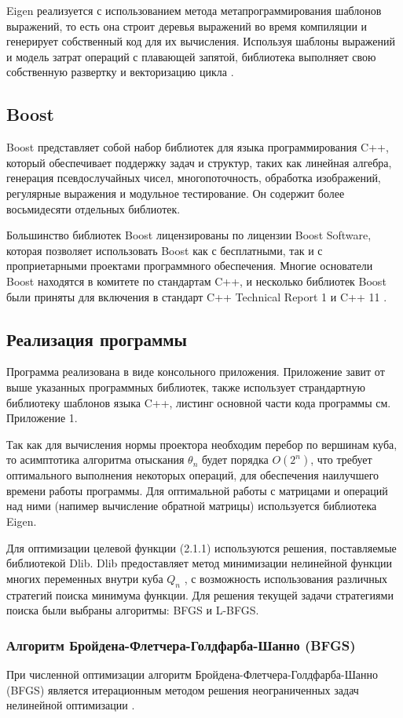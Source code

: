 \documentclass[12pt, a4paper]{extarticle}
\begin{document}
Eigen реализуется с использованием метода метапрограммирования шаблонов выражений, то есть она строит деревья выражений во время компиляции и генерирует собственный код для их вычисления. Используя шаблоны выражений и модель затрат операций с плавающей запятой, библиотека выполняет свою собственную развертку и векторизацию цикла \cite{4}.

\subsection{Boost}
Boost представляет собой набор библиотек для языка программирования C++, который обеспечивает поддержку задач и структур, таких как линейная алгебра, генерация псевдослучайных чисел, многопоточность, обработка изображений, регулярные выражения и модульное тестирование. Он содержит более восьмидесяти отдельных библиотек.

Большинство библиотек Boost лицензированы по лицензии Boost Software, которая позволяет использовать Boost как с бесплатными, так и с проприетарными проектами программного обеспечения. Многие основатели Boost находятся в комитете по стандартам C++, и несколько библиотек Boost были приняты для включения в стандарт C++ Technical Report 1 и C++ 11 \cite{5}.

\subsection{Реализация программы}
Программа реализована в виде консольного приложения. Приложение завит от выше указанных программных библиотек, также использует страндартную библиотеку шаблонов языка C++, листинг основной части кода программы см. Приложение 1. 

Так как для вычисления нормы проектора необходим перебор по вершинам куба, то асимптотика алгоритма отыскания $\theta_n$ будет порядка $O(2^n)$, что требует оптимального выполнения некоторых операций, для обеспечения наилучшего времени работы программы. Для оптимальной работы с матрицами и операций над ними (напимер вычисление обратной матрицы) используется библиотека Eigen.

Для оптимизации целевой функции (2.1.1) используются решения, поставляемые библиотекой Dlib. Dlib предоставляет метод минимизации нелинейной функции многих переменных внутри куба $Q_n$ , с возможность использования различных стратегий поиска минимума функции. Для решения текущей задачи стратегиями поиска были выбраны алгоритмы: BFGS и L-BFGS.
\subsubsection{Алгоритм Бройдена-Флетчера-Голдфарба-Шанно (BFGS)}
При численной оптимизации алгоритм Бройдена-Флетчера-Голдфарба-Шанно (BFGS) является итерационным методом решения неограниченных задач нелинейной оптимизации \cite{6}.
\end{document}
